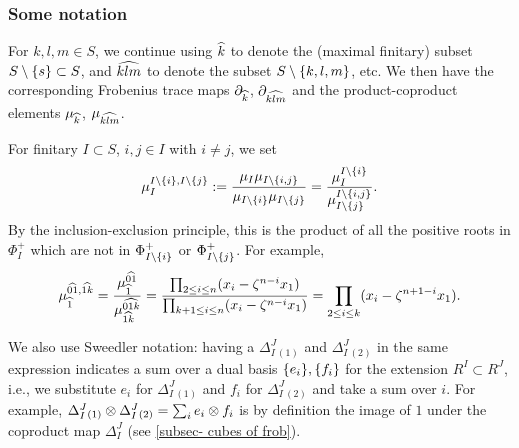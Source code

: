
\subsubsection{Some notation} \label{subsubsec-notation in further calculations.}
For $k,l,m \in S$, we continue using $\widehat{k}$ to denote the (maximal finitary) subset $S \setminus \{s\} \subset S$, and $\widehat{klm}$ to denote the subset $S \setminus \{k,l,m\}$, etc. 
We then have the corresponding Frobenius trace maps $\partial_{\widehat{k}}$, $\partial_{\widehat{klm}}$ and the product-coproduct elements $\mu_{\widehat{k}}$, $\mu_{\widehat{klm}}$.

For finitary $I \subset S$, $i,j \in I$ with $i\neq j$, we set
\begin{equation} \label{eq mu I I minus j I minus i}
  \mu_{I}^{I\setminus \{i\}, I\setminus \{j\}}:=  \frac{\mu_I\mu_{I\setminus \{i,j\}}}{\mu_{I\setminus \{i\}}\mu_{I\setminus \{j\}}}=\frac{\mu_I^{I\setminus \{i\}}}{\mu_{I\setminus \{j\}}^{I\setminus \{i,j\}}}.
\end{equation}
By the inclusion-exclusion principle, this is the product of all the positive roots in $\Phi^+_I$ which are not in $\Phi^+_{I \setminus \{i\}}$ or $\Phi^+_{I \setminus \{j\}}$.
For example, 
\begin{equation} \label{mu01k} \mu_{\widehat{1}}^{\widehat{01},\widehat{1k}}= \frac{\mu_{\widehat{1}}^{\widehat{01}}}{\mu_{\widehat{1k}}^{\widehat{01k}}}= \frac{\prod_{2\leq i \leq n}(x_i - \zeta^{n-i}x_1)}{\prod_{k+1\leq i \leq n}(x_i - \zeta^{n-i}x_1)}=\prod_{2\leq i \leq k}(x_i - \zeta^{n+1-i}x_1).
\end{equation}

We also use Sweedler notation: having a $\Delta^J_{I}{}_{(1)}$ and $\Delta^J_{I}{}_{(2)}$ in the same expression indicates a sum over a dual basis $\{e_i\}, \{f_i\}$ for the extension $R^I \subset R^J$, i.e., we substitute $e_i$ for $\Delta^J_{I}{}_{(1)}$ and $f_i$ for $\Delta^J_{I}{}_{(2)}$ and take a sum over $i$.
For example, $\Delta^J_{I}{}_{(1)}\otimes \Delta^J_{I}{}_{(2)} = \sum_i e_i \otimes f_i$ is by definition the image of $1$ under the coproduct map  $\Delta_I^J$ (see \cref{subsec- cubes of frob}).


